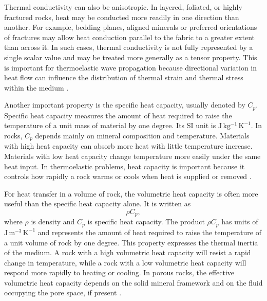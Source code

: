 Thermal conductivity can also be anisotropic. In layered, foliated, or highly fractured rocks, heat may be conducted more readily in one direction than another. For example, bedding planes, aligned minerals or preferred orientations of fractures may allow heat conduction parallel to the fabric to a greater extent than across it. In such cases, thermal conductivity is not fully represented by a single scalar value and may be treated more generally as a tensor property. This is important for thermoelastic wave propagation because directional variation in heat flow can influence the distribution of thermal strain and thermal stress within the medium \cite{robertson1988,turcotte2014}.

Another important property is the specific heat capacity, usually denoted by \(C_p\). Specific heat capacity measures the amount of heat required to raise the temperature of a unit mass of material by one degree. Its SI unit is \(\mathrm{J\,kg^{-1}\,K^{-1}}\). In rocks, \(C_p\) depends mainly on mineral composition and temperature. Materials with high heat capacity can absorb more heat with little temperature increase. Materials with low heat capacity change temperature more easily under the same heat input. In thermoelastic problems, heat capacity is important because it controls how rapidly a rock warms or cools when heat is supplied or removed \cite{robertson1988,turcotte2014}.

For heat transfer in a volume of rock, the volumetric heat capacity is often more useful than the specific heat capacity alone. It is written as
\begin{equation}
\rho C_p,
\end{equation}
where \(\rho\) is density and \(C_p\) is specific heat capacity. The product \(\rho C_p\) has units of \(\mathrm{J\,m^{-3}\,K^{-1}}\) and represents the amount of heat required to raise the temperature of a unit volume of rock by one degree. This property expresses the thermal inertia of the medium. A rock with a high volumetric heat capacity will resist a rapid change in temperature, while a rock with a low volumetric heat capacity will respond more rapidly to heating or cooling. In porous rocks, the effective volumetric heat capacity depends on the solid mineral framework and on the fluid occupying the pore space, if present \cite{robertson1988,wolff1982}.

